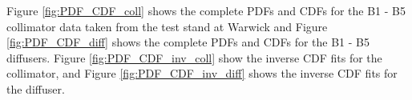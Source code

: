 \begin{figure}
    
\end{figure}


Figure \ref{fig:PDF_CDF_coll} shows the complete PDFs and CDFs for the B1 - B5 collimator data taken from the test stand at Warwick and Figure \ref{fig:PDF_CDF_diff} shows the complete PDFs and CDFs for the B1 - B5 diffusers. Figure \ref{fig:PDF_CDF_inv_coll} show the inverse CDF fits for the collimator, and Figure \ref{fig:PDF_CDF_inv_diff} shows the inverse CDF fits for the diffuser. 

